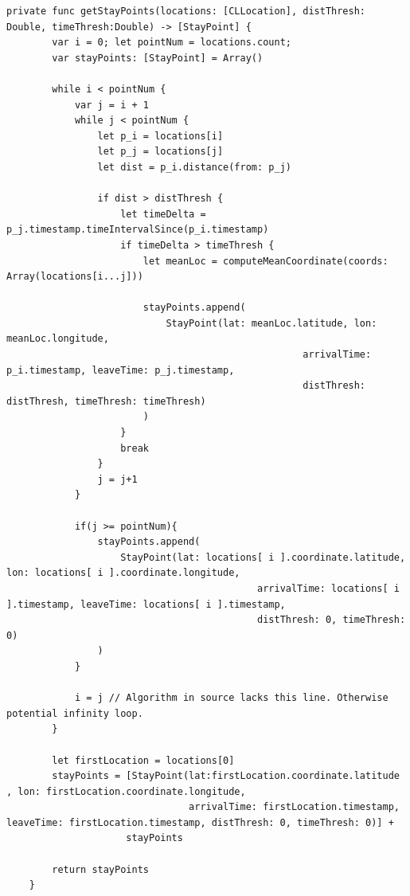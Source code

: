 \begin{lstlisting}[style=swift, caption={Determine Stay Points - Implementation}, label={code:detStayPointsImpl}]
private func getStayPoints(locations: [CLLocation], distThresh: Double, timeThresh:Double) -> [StayPoint] {
        var i = 0; let pointNum = locations.count;
        var stayPoints: [StayPoint] = Array()
        
        while i < pointNum {
            var j = i + 1
            while j < pointNum {
                let p_i = locations[i]
                let p_j = locations[j]
                let dist = p_i.distance(from: p_j)
                
                if dist > distThresh {
                    let timeDelta = p_j.timestamp.timeIntervalSince(p_i.timestamp)
                    if timeDelta > timeThresh {
                        let meanLoc = computeMeanCoordinate(coords: Array(locations[i...j]))
                        
                        stayPoints.append(
                            StayPoint(lat: meanLoc.latitude, lon: meanLoc.longitude,
                                                    arrivalTime: p_i.timestamp, leaveTime: p_j.timestamp,
                                                    distThresh: distThresh, timeThresh: timeThresh)
                        )
                    }
                    break
                }
                j = j+1
            }
            
            if(j >= pointNum){
                stayPoints.append(
                    StayPoint(lat: locations[ i ].coordinate.latitude, lon: locations[ i ].coordinate.longitude,
                                            arrivalTime: locations[ i ].timestamp, leaveTime: locations[ i ].timestamp,
                                            distThresh: 0, timeThresh: 0)
                )
            }
            
            i = j // Algorithm in source lacks this line. Otherwise potential infinity loop.
        }
        
        let firstLocation = locations[0]
        stayPoints = [StayPoint(lat:firstLocation.coordinate.latitude , lon: firstLocation.coordinate.longitude,
                                arrivalTime: firstLocation.timestamp, leaveTime: firstLocation.timestamp, distThresh: 0, timeThresh: 0)] +
                     stayPoints
        
        return stayPoints
    }
\end{lstlisting}{}

